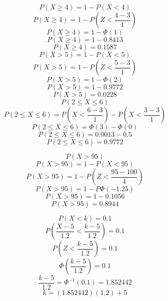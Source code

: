 $$P(X\geq4)=1-P(X<4)$$
$$P(X\geq4)=1-P(Z<\frac{4-3}{1})$$
$$P(X\geq4)=1-\Phi(1)$$
$$P(X\geq4)=1-0.8413$$
$$P(X\geq4)=0.1587$$
$$P(X>5)=1-P(X<5)$$
$$P(X>5)=1-P(Z<\frac{5-3}{1})$$
$$P(X>5)=1-\Phi(2)$$
$$P(X>5)=1-0.9772$$
$$P(X>5)=0.0228$$
$$P(2\leq X \leq6)$$
$$P(2\leq X \leq6)=P(X<\frac{6-3}{1})-P(X<\frac{3-3}{1})$$
$$P(2\leq X \leq6)=\Phi(3)-\Phi(0)$$
$$P(2\leq X \leq6)=0.0013-0.5$$
$$P(2\leq X \leq6)=0.9772$$

$$P(X>95)$$
$$P(X>95)=1-P(X<95)$$
$$P(X>95)=1-P(Z<\frac{95-100}{4})$$
$$P(X>95)=1-P\Phi(-1.25)$$
$$P(X>95)=1-0.1056$$
$$P(X>95)=0.8944$$

$$P(X<k)=0.1$$
$$P(\frac{X-5}{1.2}<\frac{k-5}{1.2})=0.1$$
$$P(Z<\frac{k-5}{1.2})=0.1$$
$$\Phi(\frac{k-5}{1.2})=0.1$$
$$\frac{k-5}{1.2}={\Phi}^{-1}(0.1)=1.852442$$
$$k=(1.852442)(1.2)+5$$
$$